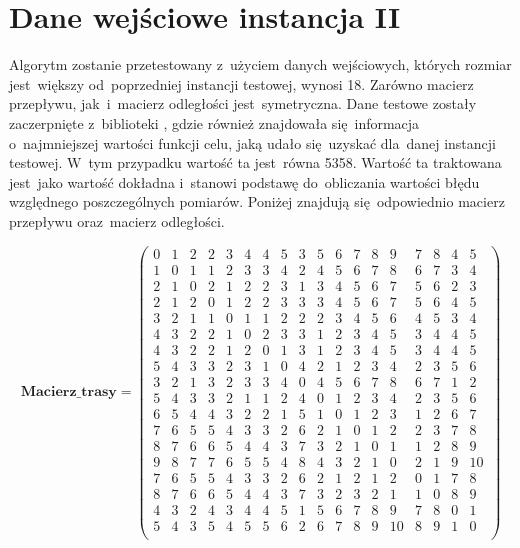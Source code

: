\section{Dane wejściowe instancja II}

Algorytm zostanie przetestowany z~użyciem danych wejściowych, których rozmiar jest~większy od~poprzedniej instancji testowej, wynosi 18. Zarówno macierz przepływu, jak~i~macierz odległości jest~symetryczna. Dane testowe zostały zaczerpnięte z~biblioteki \cite{qaplib}, gdzie również znajdowała się~informacja o~najmniejszej wartości funkcji celu, jaką udało się~uzyskać dla~danej instancji testowej. W~tym przypadku wartość ta jest~równa 5358. Wartość ta traktowana jest~jako wartość dokładna i~stanowi podstawę do~obliczania wartości błędu względnego poszczególnych pomiarów. Poniżej znajdują się~odpowiednio macierz przepływu oraz~macierz odległości.

\par
$$
\mathbf{Macierz\_trasy} =
\left( \begin{array}{cccccccccccccccccc}
0& 1& 2& 2& 3& 4& 4& 5& 3& 5& 6& 7& 8& 9& 7& 8& 4& 5\\
1& 0& 1& 1& 2& 3& 3& 4& 2& 4& 5& 6& 7& 8& 6& 7& 3& 4\\
2& 1& 0& 2& 1& 2& 2& 3& 1& 3& 4& 5& 6& 7& 5& 6& 2& 3\\
2& 1& 2& 0& 1& 2& 2& 3& 3& 3& 4& 5& 6& 7& 5& 6& 4& 5\\
3& 2& 1& 1& 0& 1& 1& 2& 2& 2& 3& 4& 5& 6& 4& 5& 3& 4\\
4& 3& 2& 2& 1& 0& 2& 3& 3& 1& 2& 3& 4& 5& 3& 4& 4& 5\\
4& 3& 2& 2& 1& 2& 0& 1& 3& 1& 2& 3& 4& 5& 3& 4& 4& 5\\
5& 4& 3& 3& 2& 3& 1& 0& 4& 2& 1& 2& 3& 4& 2& 3& 5& 6\\
3& 2& 1& 3& 2& 3& 3& 4& 0& 4& 5& 6& 7& 8& 6& 7& 1& 2\\
5& 4& 3& 3& 2& 1& 1& 2& 4& 0& 1& 2& 3& 4& 2& 3& 5& 6\\
6& 5& 4& 4& 3& 2& 2& 1& 5& 1& 0& 1& 2& 3& 1& 2& 6& 7\\
7& 6& 5& 5& 4& 3& 3& 2& 6& 2& 1& 0& 1& 2& 2& 3& 7& 8\\
8& 7& 6& 6& 5& 4& 4& 3& 7& 3& 2& 1& 0& 1& 1& 2& 8& 9\\
9& 8& 7& 7& 6& 5& 5& 4& 8& 4& 3& 2& 1& 0& 2& 1& 9& 10\\
7& 6& 5& 5& 4& 3& 3& 2& 6& 2& 1& 2& 1& 2& 0& 1& 7& 8\\
8& 7& 6& 6& 5& 4& 4& 3& 7& 3& 2& 3& 2& 1& 1& 0& 8& 9\\
4& 3& 2& 4& 3& 4& 4& 5& 1& 5& 6& 7& 8& 9& 7& 8& 0& 1\\
5& 4& 3& 5& 4& 5& 5& 6& 2& 6& 7& 8& 9& 10& 8& 9& 1& 0\\
\end{array} \right)
$$

